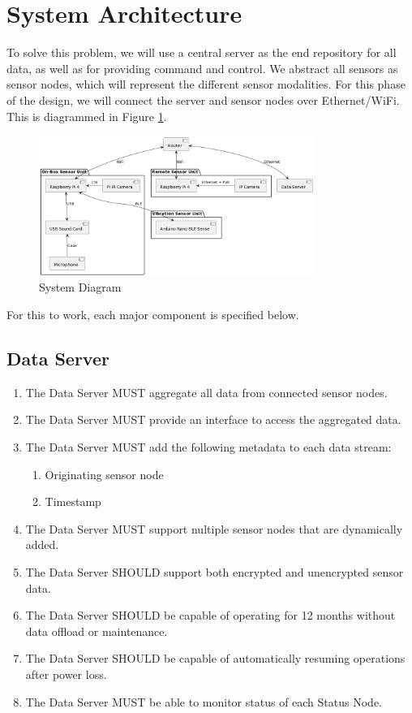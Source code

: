 \documentclass{article}
\begin{document}
\section{System Architecture}
To solve this problem, we will use a central server as the end repository for all data, as well as for providing command and control.  We abstract all sensors as sensor nodes, which will represent the different sensor modalities.  For this phase of the design, we will connect the server and sensor nodes over Ethernet/WiFi. This is diagrammed in Figure \ref{fig:sys_diag}.

\begin{figure}[ht]
    \centering
    \includegraphics[width=0.8\textwidth]{images/System Diagram.png}
    \caption{System Diagram}
    \label{fig:sys_diag}
\end{figure}

For this to work, each major component is specified below.

\subsection{Data Server}
\begin{enumerate}
    \item The Data Server MUST aggregate all data from connected sensor nodes.
    \item The Data Server MUST provide an interface to access the aggregated data.
    \item The Data Server MUST add the following metadata to each data stream:
    \begin{enumerate}
        \item Originating sensor node
        \item Timestamp
    \end{enumerate}
    \item The Data Server MUST support nultiple sensor nodes that are dynamically added.
    \item The Data Server SHOULD support both encrypted and unencrypted sensor data.
    \item The Data Server SHOULD be capable of operating for 12 months without data offload or maintenance.
    \item The Data Server SHOULD be capable of automatically resuming operations after power loss.
    \item The Data Server MUST be able to monitor status of each Status Node.
\end{enumerate}
\end{document}
